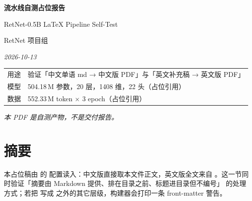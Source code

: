 \documentclass[11pt,openany]{ctexart}
\begin{document}
\thispagestyle{empty}

\begin{center}
\vspace*{3.2cm}

{\LARGE\bfseries 流水线自测占位报告}

\vspace{0.55cm}

{\large RetNet-0.5B LaTeX Pipeline Self-Test}

\vspace{1.1cm}

{\normalsize RetNet 项目组}

\vspace{0.25cm}

{\small\itshape 2026-10-13}

\vspace{2.2cm}

\begin{minipage}{0.80\textwidth}
\centering\small
\begin{tabular}{@{}rl@{}}
\toprule
用途 & 验证「中文单语 md → 中文版 PDF」与「英文补充稿 → 英文版 PDF」\\
模型 & 504.18\,M 参数，20 层，1408 维，22 头（占位引用）\\
数据 & 552.33\,M token $\times$ 3 epoch（占位引用）\\
\bottomrule
\end{tabular}
\end{minipage}

\vfill

{\small\itshape 本 PDF 是自测产物，不是交付报告。}

\vspace{1.2cm}
\end{center}

\clearpage


\section*{摘要}


本占位稿由  的  配置读入：中文版直接取本文件正文，英文版全文来自 。这一节同时验证「摘要由 Markdown 提供、排在目录之前、标题进目录但不编号」 的处理方式；若把  写成 \code{\allowbreak{}\#} 之外的其它层级，构建器会打印一条 front-matter 警告。
\end{document}
